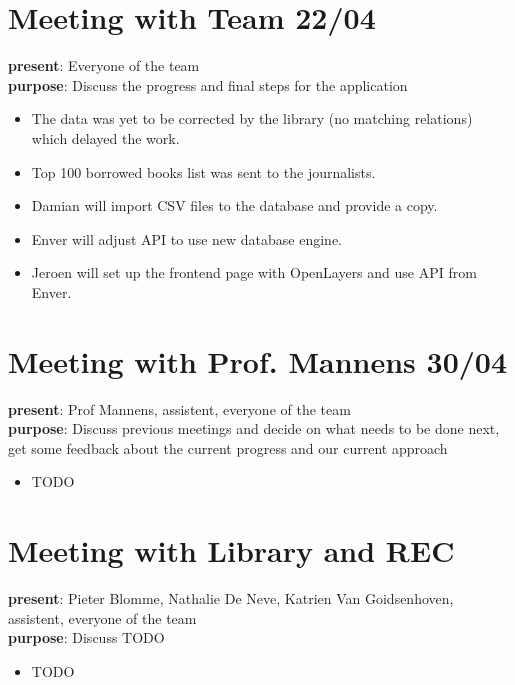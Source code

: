 \section{Meeting with Team 22/04}
{\bf present}: Everyone of the team\\
{\bf purpose}: Discuss the progress and final steps for the application\\
\begin{itemize}
	\item The data was yet to be corrected by the library (no matching relations) which delayed the work.
	\item Top 100 borrowed books list was sent to the journalists.
	\item Damian will import CSV files to the database and provide a copy.
	\item Enver will adjust API to use new database engine.
	\item Jeroen will set up the frontend page with OpenLayers and use API from Enver.
\end{itemize}

\section{Meeting with Prof. Mannens 30/04}
{\bf present}: Prof Mannens, assistent, everyone of the team\\
{\bf purpose}: Discuss previous meetings and decide on what needs to be done next, get some feedback about the current progress and our current approach\\
\begin{itemize}
	\item TODO
\end{itemize}

\section{Meeting with Library and REC}
{\bf present}: Pieter Blomme, Nathalie De Neve, Katrien Van Goidsenhoven, assistent, everyone of the team\\
{\bf purpose}: Discuss TODO\\
\begin{itemize}
	\item TODO
\end{itemize}